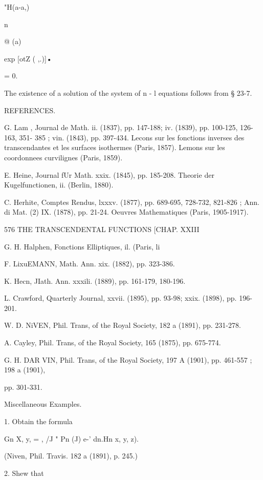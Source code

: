 {{{{{{{{"H(a-a,)



n



@ (a)



exp [otZ ( ,.)]•



= 0.



The existence of a solution of the system of n - l equations follows
from § 23-7.

REFERENCES.

G. Lam , Journal de Math. ii. (1837), pp. 147-188; iv. (1839), pp.
100-125, 126-163, 351- 385 ; vin. (1843), pp. 397-434. Lecons sur les
fonctions inverses des transcendantes et les surfaces isothermes
(Paris, 1857). Lemons sur les coordonnees curvilignes (Paris, 1859).

E. Heine, Journal fUr Math. xxix. (1845), pp. 185-208. Theorie der
Kugelfunctionen, ii. (Berlin, 1880).

C. Herhite, Comptes Rendus, lxxxv. (1877), pp. 689-695, 728-732,
821-826 ; Ann. di Mat. (2) IX. (1878), pp. 21-24. Oeuvres
Mathematiques (Paris, 1905-1917).



576 THE TRANSCENDENTAL FUNCTIONS [CHAP. XXIII



G. H. Halphen, Fonctions Elliptiques, il. (Paris, li

F. LixuEMANN, Math. Ann. xix. (1882), pp. 323-386.

K. Hecn, JIath. Ann. xxxili. (1889), pp. 161-179, 180-196.

L. Crawford, Quarterly Journal, xxvii. (1895), pp. 93-98; xxix.
(1898), pp. 196-201.

W. D. NiVEN, Phil. Trans, of the Royal Society, 182 a (1891), pp.
231-278.

A. Cayley, Phil. Trans, of the Royal Society, 165 (1875), pp. 675-774.

G. H. DAR VIN, Phil. Trans, of the Royal Society, 197 A (1901), pp.
461-557 ; 198 a (1901),

pp. 301-331.

Miscellaneous Examples.

1. Obtain the formula

Gn X, y, = , /J " Pn (J) e-' dn.Hn x, y, z).

(Niven, Phil. Travis. 182 a (1891), p. 245.)

2. Shew that

}}}}}}}}
